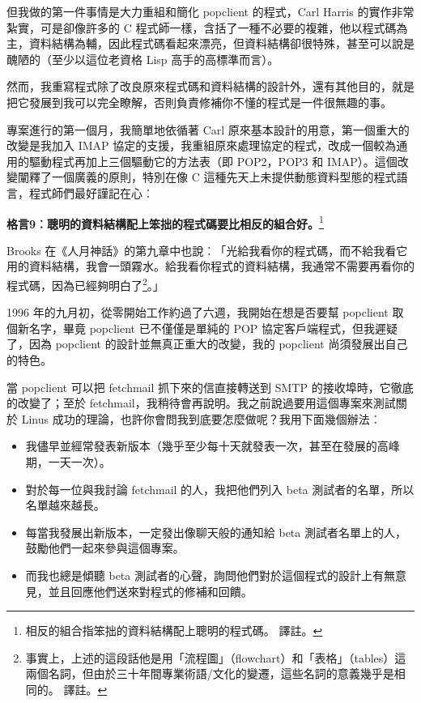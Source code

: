 \documentclass[10pt, b5paper]{book}
\makeatletter
\newcommand*{\shifttext}[2]{%
  \settowidth{\@tempdima}{#2}%
  \makebox[\@tempdima]{\hspace*{#1}#2}%
}
\makeatother
\begin{document}
但我做的第一件事情是大力重組和簡化 popclient 的程式，Carl Harris
的實作非常紮實，可是卻像許多的 C
程式師一樣，含括了一種不必要的複雜，他以程式碼為主，資料結構為輔，因此程式碼看起來漂亮，但資料結構卻很特殊，甚至可以說是醜陋的（至少以這位老資格
Lisp 高手的高標準而言）。

然而，我重寫程式除了改良原來程式碼和資料結構的設計外，還有其他目的，就是把它發展到我可以完全瞭解，否則負責修補你不懂的程式是一件很無趣的事。

專案進行的第一個月，我簡單地依循著 Carl
原來基本設計的用意，第一個重大的改變是我加入 IMAP
協定的支援，我重組原來處理協定的程式，改成一個較為通用的驅動程式再加上三個驅動它的方法表（即
POP2，POP3 和 IMAP）。這個改變闡釋了一個廣義的原則，特別在像 C
這種先天上未提供動態資料型態的程式語言，程式師們最好謹記在心︰

\textbf{格言9︰聰明的資料結構配上笨拙的程式碼要比相反的組合好。}\footnote{相反的組合指笨拙的資料結構配上聰明的程式碼。
  \shifttext{1pt}{---}\shifttext{-1pt}{---} 譯註。}

Brooks
在《人月神話》的第九章中也說︰「光給我看你的程式碼，而不給我看它用的資料結構，我會一頭霧水。給我看你程式的資料結構，我通常不需要再看你的程式碼，因為已經夠明白了\footnote{事實上，上述的這段話他是用「流程圖」（flowchart）和「表格」（tables）這兩個名詞，但由於三十年間專業術語/文化的變遷，這些名詞的意義幾乎是相同的。
  \shifttext{1pt}{---}\shifttext{-1pt}{---} 譯註。}。」

1996 年的九月初，從零開始工作約過了六週，我開始在想是否要幫 popclient
取個新名字，畢竟 popclient 已不僅僅是單純的 POP
協定客戶端程式，但我遲疑了，因為 popclient 的設計並無真正重大的改變，我的
popclient 尚須發展出自己的特色。

當 popclient 可以把 fetchmail 抓下來的信直接轉送到 SMTP
的接收埠時，它徹底的改變了；至於
fetchmail，我稍待會再說明。我之前說過要用這個專案來測試關於 Linus
成功的理論，也許你會問我到底要怎麼做呢？我用下面幾個辦法︰

\begin{itemize}
\item
  我儘早並經常發表新版本（幾乎至少每十天就發表一次，甚至在發展的高峰期，一天一次）。
\item
  對於每一位與我討論 fetchmail 的人，我把他們列入 beta
  測試者的名單，所以名單越來越長。
\item
  每當我發展出新版本，一定發出像聊天般的通知給 beta
  測試者名單上的人，鼓勵他們一起來參與這個專案。
\item
  而我也總是傾聽 beta
  測試者的心聲，詢問他們對於這個程式的設計上有無意見，並且回應他們送來對程式的修補和回饋。
\end{itemize}
\end{document}
